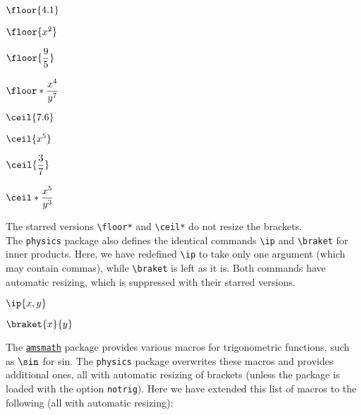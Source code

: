 \begin{multicols}{2}
\begin{verbbox}[righthand width=3cm]
$\floor{4.1}$
\end{verbbox}
\begin{verbbox}[righthand width=3cm]
$\floor{x^2}$
\end{verbbox}
\begin{verbbox}[righthand width=3cm]
$\floor{\dfrac{9}{5}}$
\end{verbbox}
\begin{verbbox}[righthand width=3cm]
$\floor*{\dfrac{x^4}{y^7}}$
\end{verbbox}
\begin{verbbox}[righthand width=3cm]
$\ceil{7.6}$
\end{verbbox}
\begin{verbbox}[righthand width=3cm]
$\ceil{x^5}$
\end{verbbox}
\begin{verbbox}[righthand width=3cm]
$\ceil{\dfrac{3}{7}}$
\end{verbbox}
\begin{verbbox}[righthand width=3cm]
$\ceil*{\dfrac{x^5}{y^3}}$
\end{verbbox}
\end{multicols}

The starred versions \verb!\floor*! and \verb!\ceil*! do not resize the brackets.\\

The \texttt{physics} package also defines the identical commands \verb!\ip! and \verb!\braket! for inner products. Here, we have redefined \verb!\ip! to take only one argument (which may contain commas), while \verb!\braket! is left as it is. Both commands have automatic resizing, which is suppressed with their starred versions.

\begin{multicols}{2}
\begin{verbbox}
$\ip{x,y}$
\end{verbbox}
\begin{verbbox}
$\braket{x}{y}$
\end{verbbox}
\end{multicols}

The \href{https://ctan.org/pkg/amsmath}{\texttt{amsmath}} package provides various macros for trigonometric functions, such as $\verb!\sin!$ for sin. The \texttt{physics} package overwrites these macros and provides additional ones, all with automatic resizing of brackets (unless the package is loaded with the option \texttt{notrig}). Here we have extended this list of macros to the following (all with automatic resizing):

